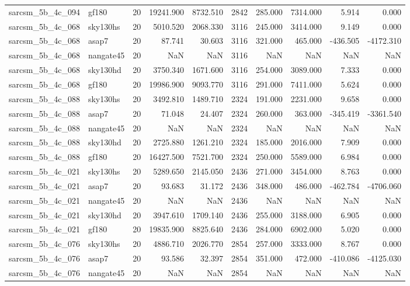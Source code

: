 \documentclass{article}
\begin{document}
\begin{longtable}{llrrrrrrrr}
sarcsm\_5b\_4c\_094 & gf180 & 20 & 19241.900 & 8732.510 & 2842 & 285.000 & 7314.000 & 5.914 & 0.000 \\
sarcsm\_5b\_4c\_068 & sky130hs & 20 & 5010.520 & 2068.330 & 3116 & 245.000 & 3414.000 & 9.149 & 0.000 \\
sarcsm\_5b\_4c\_068 & asap7 & 20 & 87.741 & 30.603 & 3116 & 321.000 & 465.000 & -436.505 & -4172.310 \\
sarcsm\_5b\_4c\_068 & nangate45 & 20 & NaN & NaN & 3116 & NaN & NaN & NaN & NaN \\
sarcsm\_5b\_4c\_068 & sky130hd & 20 & 3750.340 & 1671.600 & 3116 & 254.000 & 3089.000 & 7.333 & 0.000 \\
sarcsm\_5b\_4c\_068 & gf180 & 20 & 19986.900 & 9093.770 & 3116 & 291.000 & 7411.000 & 5.624 & 0.000 \\
sarcsm\_5b\_4c\_088 & sky130hs & 20 & 3492.810 & 1489.710 & 2324 & 191.000 & 2231.000 & 9.658 & 0.000 \\
sarcsm\_5b\_4c\_088 & asap7 & 20 & 71.048 & 24.407 & 2324 & 260.000 & 363.000 & -345.419 & -3361.540 \\
sarcsm\_5b\_4c\_088 & nangate45 & 20 & NaN & NaN & 2324 & NaN & NaN & NaN & NaN \\
sarcsm\_5b\_4c\_088 & sky130hd & 20 & 2725.880 & 1261.210 & 2324 & 185.000 & 2016.000 & 7.909 & 0.000 \\
sarcsm\_5b\_4c\_088 & gf180 & 20 & 16427.500 & 7521.700 & 2324 & 250.000 & 5589.000 & 6.984 & 0.000 \\
sarcsm\_5b\_4c\_021 & sky130hs & 20 & 5289.650 & 2145.050 & 2436 & 271.000 & 3454.000 & 8.763 & 0.000 \\
sarcsm\_5b\_4c\_021 & asap7 & 20 & 93.683 & 31.172 & 2436 & 348.000 & 486.000 & -462.784 & -4706.060 \\
sarcsm\_5b\_4c\_021 & nangate45 & 20 & NaN & NaN & 2436 & NaN & NaN & NaN & NaN \\
sarcsm\_5b\_4c\_021 & sky130hd & 20 & 3947.610 & 1709.140 & 2436 & 255.000 & 3188.000 & 6.905 & 0.000 \\
sarcsm\_5b\_4c\_021 & gf180 & 20 & 19835.900 & 8825.640 & 2436 & 284.000 & 6902.000 & 5.020 & 0.000 \\
sarcsm\_5b\_4c\_076 & sky130hs & 20 & 4886.710 & 2026.770 & 2854 & 257.000 & 3333.000 & 8.767 & 0.000 \\
sarcsm\_5b\_4c\_076 & asap7 & 20 & 93.586 & 32.397 & 2854 & 351.000 & 472.000 & -410.086 & -4125.030 \\
sarcsm\_5b\_4c\_076 & nangate45 & 20 & NaN & NaN & 2854 & NaN & NaN & NaN & NaN \\

\end{longtable}
\end{document}
